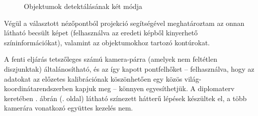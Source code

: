 \begin{figure}[b]

\caption{Objektumok detektálásának két módja \label{fig:plan-objects}}
\end{figure}



Végül a választott nézőpontból projekció segítségével meghatároztam az onnan látható becsült képet (felhasználva az eredeti képből kinyerhető színinformációkat), valamint az objektumokhoz tartozó kontúrokat.

A fenti eljárás tetszőleges számú kamera-párra (amelyek nem feltétlen diszjunktak) általánosítható, és az így kapott pontfelhőket -- felhasználva, hogy az adatokat az előzetes kalibrációnak köszönhetően egy közös világ-koordinátarendszerben kapjuk meg -- könnyen egyesíthetjük. A diplomaterv keretében . ábrán (\pageref{fig:of-method}. oldal) látható színezett hátterű lépések készültek el, a több kamerára vonatkozó együttes kezelés nem.

